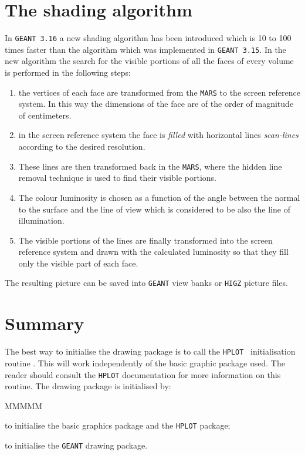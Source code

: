 \section{The shading algorithm}
In {\tt GEANT 3.16} a new shading algorithm has been introduced which
is 10 to 100 times faster than the algorithm which was implemented in
{\tt GEANT 3.15}. In the new algorithm the search for the visible portions
of all the faces of every volume is performed in the following steps:
\begin{enumerate}
\item the vertices of each face are transformed from the {\tt MARS} to
the screen reference system. In this way the dimensions of the face are
of the order of magnitude of centimeters.
\item in the screen reference system the face is {\it filled} with
horizontal lines {\it scan-lines} according to the desired resolution.
\item These lines are then transformed back in the {\tt MARS}, where the
hidden line removal technique is used to find their visible portions.
\item The colour luminosity is chosen as a function of the angle between
the normal to the surface and the line of view which is considered to be
also the line of illumination.
\item The visible portions of the lines are finally transformed into the
screen reference system and drawn with the calculated luminosity so that
they fill only the visible part of each face.
\end{enumerate}
The resulting picture can be saved into {\tt GEANT} view banks or {\tt HIGZ}
picture files.
 
\section{ Summary}
 
The best way to initialise the drawing package is to call the 
{\tt HPLOT}~\cite{bib-HPLOT}
initialisation routine . This will work independently of the 
basic graphic package used. The reader should consult the {\tt HPLOT}
documentation for more information on this routine.
The drawing package is initialised by:
\begin{DLtt}{MMMMM}
\item[\Rind{HPLINT}] to initialise the basic graphics package and the 
{\tt HPLOT} package;
\item[\Rind{GDINIT}] to initialise the {\tt GEANT} drawing package.
\end{DLtt}
 

